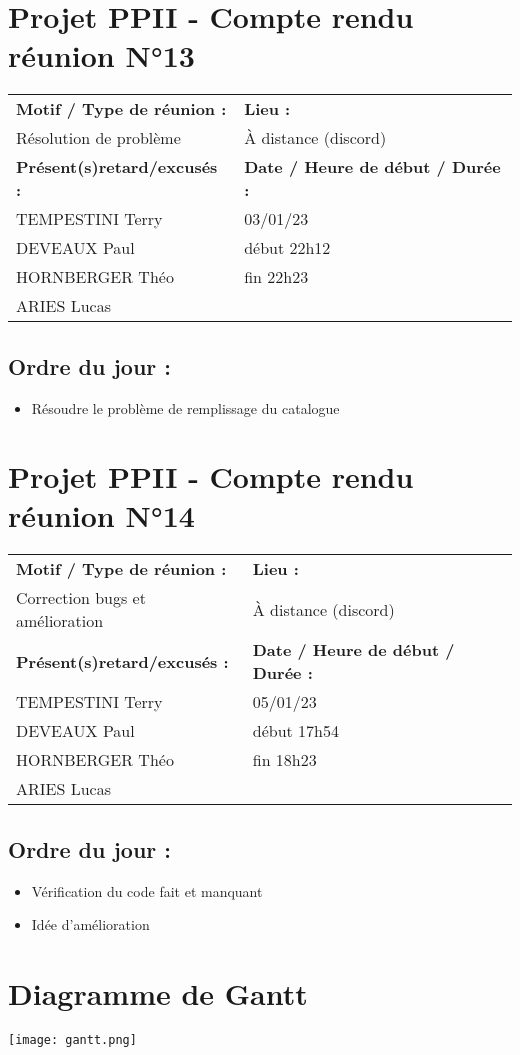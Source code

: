 \documentclass[12pt,titlepage]{report}
\begin{document}
\section*{Projet PPII - Compte rendu réunion N°13}
\begin{tabular}{|p{7cm}|p{6cm}|}
    \hline
    \textbf{Motif / Type de réunion :}
    & \textbf{Lieu :}
    \\
    Résolution de problème
    & 
    À distance (discord)
    \\ \hline
    \textbf{Présent(s)retard/excusés :}
    &
    \textbf{Date / Heure de début / Durée :}
    \\ 
    TEMPESTINI Terry &  03/01/23\\  
    DEVEAUX Paul & début 22h12\\
    HORNBERGER Théo & fin 22h23\\
    ARIES Lucas & 
    \\ \hline
\end{tabular}

\subsection*{Ordre du jour :}
\begin{itemize}
    \item{Résoudre le problème de remplissage du catalogue}
\end{itemize}
\newpage

\section*{Projet PPII - Compte rendu réunion N°14}
\begin{tabular}{|p{7cm}|p{6cm}|}
    \hline
    \textbf{Motif / Type de réunion :}
    & \textbf{Lieu :}
    \\
    Correction bugs et amélioration
    & 
    À distance (discord)
    \\ \hline
    \textbf{Présent(s)retard/excusés :}
    &
    \textbf{Date / Heure de début / Durée :}
    \\ 
    TEMPESTINI Terry &  05/01/23\\  
    DEVEAUX Paul & début 17h54\\
    HORNBERGER Théo & fin 18h23\\
    ARIES Lucas & 
    \\ \hline
\end{tabular}

\subsection*{Ordre du jour :}
\begin{itemize}
    \item{Vérification du code fait et manquant}
    \item{Idée d'amélioration}
\end{itemize}
\newpage

\section{Diagramme de Gantt}
\texttt{[image: gantt.png]}
\end{document}
